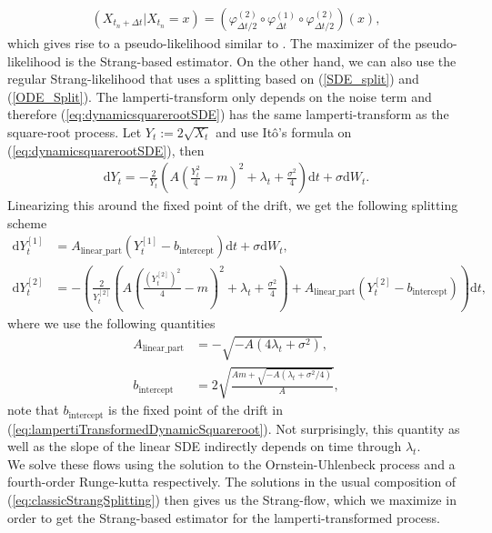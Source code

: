 \begin{align}
    \left(X_{t_n + \Delta t} | X_{t_n} = x\right) = \left(\varphi_{\Delta t/2}^{(2)} \circ \varphi_{\Delta t}^{(1)} \circ \varphi_{\Delta t/2}^{(2)}\right)(x),
\end{align} 
which gives rise to a pseudo-likelihood similar to \cite[(14)]{SplittingSchemes}. The maximizer of the pseudo-likelihood is the Strang-based estimator.
On the other hand, we can also use the regular Strang-likelihood that uses a splitting based on (\ref{SDE_split}) and (\ref{ODE_Split}). The lamperti-transform only depends on the noise term and therefore (\ref{eq:dynamicsquarerootSDE}) has the same lamperti-transform as the square-root process. Let $Y_t:= 2\sqrt{X_t}$ and use Itô's formula on (\ref{eq:dynamicsquarerootSDE}), then
\begin{align}
    \mathrm{d}Y_t = - \frac{2}{Y_t}\left(A\left(\frac{Y_t^2}{4} - m\right)^2 + \lambda_t + \frac{\sigma^2}{4}\right)\mathrm{d}t + \sigma \mathrm{d}W_t. \label{eq:lampertiTransformedDynamicSquareroot}
\end{align}
Linearizing this around the fixed point of the drift, we get the following splitting scheme
\begin{align}
    \mathrm{d}Y_t^{[1]} &= A_{\mathrm{linear\_part}}\left(Y_t^{[1]} - b_{\mathrm{intercept}}\right)\mathrm{d}t + \sigma \mathrm{d}W_t, \label{eq:lampertiSquarerootSplitting1}\\
    \mathrm{d}Y_t^{[2]} &= - \left(\frac{2}{Y_t^{[2]}}\left(A\left(\frac{\left(Y_t^{[2]}\right)^2}{4} - m\right)^2 + \lambda_t + \frac{\sigma^2}{4}\right) + A_{\mathrm{linear\_part}}\left(Y_t^{[2]} - b_{\mathrm{intercept}}\right)\right)\mathrm{d}t,
\end{align}
where we use the following quantities
\begin{align}
    A_{\mathrm{linear\_part}} &= -\sqrt{-A\left(4\lambda_t + \sigma^2\right)},\\
    b_{\mathrm{intercept}} &= 2 \sqrt{\frac{Am + \sqrt{-A\left(\lambda_t + \sigma^2/4\right)}}{A}},
\end{align}
note that $b_{\mathrm{intercept}}$ is the fixed point of the drift in (\ref{eq:lampertiTransformedDynamicSquareroot}). Not surprisingly, this quantity as well as the slope of the linear SDE indirectly depends on time through $\lambda_t$. \\
We solve these flows using the solution to the Ornstein-Uhlenbeck process and a fourth-order Runge-kutta respectively. The solutions in the usual composition of (\ref{eq:classicStrangSplitting}) then gives us the Strang-flow, which we maximize in order to get the Strang-based estimator for the lamperti-transformed process.
